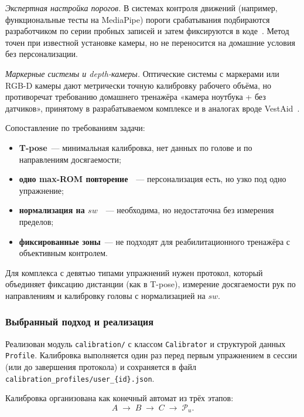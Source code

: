 \emph{Экспертная настройка порогов.}
В системах контроля движений (например, функциональные тесты на
MediaPipe) пороги срабатывания подбираются разработчиком по серии
пробных записей и затем фиксируются в коде~\cite{soma2023}. Метод
точен при известной установке камеры, но не переносится на домашние
условия без персонализации.

\emph{Маркерные системы и depth-камеры.}
Оптические системы с маркерами или RGB-D камеры дают метрически точную
калибровку рабочего объёма, но противоречат требованию домашнего
тренажёра «камера ноутбука + без датчиков», принятому в
разрабатываемом комплексе и в аналогах вроде VestAid~\cite{hovareshti2021}.

Сопоставление по требованиям задачи:
\begin{itemize}
    \item \textbf{T-pose}~--- минимальная калибровка, нет данных по
    голове и по направлениям досягаемости;
    \item \textbf{одно max-ROM повторение}~\cite{hou2025}~---
    персонализация есть, но узко под одно упражнение;
    \item \textbf{нормализация на $sw$}~\cite{mediapipe_pose}~---
    необходима, но недостаточна без измерения пределов;
    \item \textbf{фиксированные зоны}~--- не подходят для
    реабилитационного тренажёра с объективным контролем.
\end{itemize}

Для комплекса с девятью типами упражнений нужен протокол, который
объединяет фиксацию дистанции (как в T-pose), измерение досягаемости
рук по направлениям и калибровку головы с нормализацией на $sw$.

\subsubsection{Выбранный подход и реализация}

Реализован модуль \texttt{calibration/} с классом \texttt{Calibrator}
и структурой данных \texttt{Profile}. Калибровка выполняется один раз
перед первым упражнением в сессии (или до завершения протокола) и
сохраняется в файл \texttt{calibration\_profiles/user\_\{id\}.json}.


Калибровка организована как конечный автомат из трёх этапов:
\[
A \;\rightarrow\; B \;\rightarrow\; C \;\rightarrow\; \mathcal{P}_u.
\]

